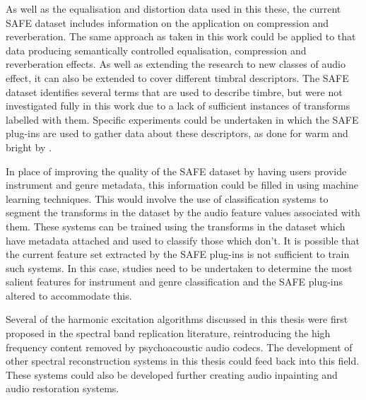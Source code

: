 	As well as the equalisation and distortion data used in this these, the current SAFE dataset includes information on
	the application on compression and reverberation. The same approach as taken in this work could be applied to that
	data producing semantically controlled equalisation, compression and reverberation effects. As well as extending the
	research to new classes of audio effect, it can also be extended to cover different timbral descriptors. The SAFE
	dataset identifies several terms that are used to describe timbre, but were not investigated fully in this work due
	to a lack of sufficient instances of transforms labelled with them. Specific experiments could be undertaken in
	which the SAFE plug-ins are used to gather data about these descriptors, as done for warm and bright by
	\citet{stasis2015a}.

	In place of improving the quality of the SAFE dataset by having users provide instrument and genre metadata, this
	information could be filled in using machine learning techniques. This would involve the use of classification
	systems to segment the transforms in the dataset by the audio feature values associated with them. These systems can
	be trained using the transforms in the dataset which have metadata attached and used to classify those which don't.
	It is possible that the current feature set extracted by the SAFE plug-ins is not sufficient to train such systems.
	In this case, studies need to be undertaken to determine the most salient features for instrument and genre
	classification and the SAFE plug-ins altered to accommodate this.

	Several of the harmonic excitation algorithms discussed in this thesis were first proposed in the spectral band
	replication literature, reintroducing the high frequency content removed by psychoacoustic audio codecs. The
	development of other spectral reconstruction systems in this thesis could feed back into this field. These systems
	could also be developed further creating audio inpainting and audio restoration systems.
